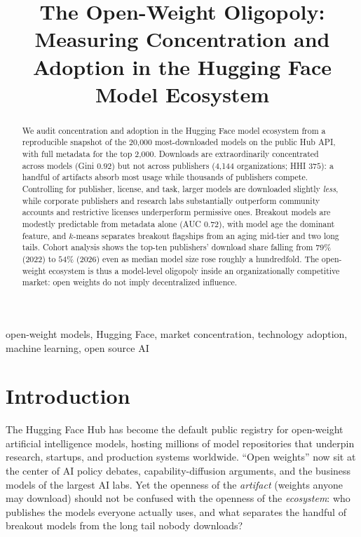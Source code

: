 \documentclass[conference]{IEEEtran}
\begin{document}
\title{\fontsize{24}{28}\selectfont The Open-Weight Oligopoly: Measuring
Concentration and Adoption in the Hugging Face Model Ecosystem}

\author{
}
\maketitle
\thispagestyle{empty}

\begin{abstract}
We audit concentration and adoption in the Hugging Face model ecosystem from a reproducible snapshot of the 20,000 most-downloaded models on the public Hub API, with full metadata for the top 2,000. Downloads are extraordinarily concentrated across models (Gini $0.92$) but not across publishers (4,144 organizations; HHI $375$): a handful of artifacts absorb most usage while thousands of publishers compete. Controlling for publisher, license, and task, larger models are downloaded slightly \emph{less}, while corporate publishers and research labs substantially outperform community accounts and restrictive licenses underperform permissive ones. Breakout models are modestly predictable from metadata alone (AUC $0.72$), with model age the dominant feature, and $k$-means separates breakout flagships from an aging mid-tier and two long tails. Cohort analysis shows the top-ten publishers' download share falling from $79\%$ (2022) to $54\%$ (2026) even as median model size rose roughly a hundredfold. The open-weight ecosystem is thus a model-level oligopoly inside an organizationally competitive market: open weights do not imply decentralized influence.
\end{abstract}

\begin{IEEEkeywords}
open-weight models, Hugging Face, market concentration, technology adoption,
machine learning, open source AI
\end{IEEEkeywords}

\section{Introduction}
The Hugging Face Hub has become the default public registry for open-weight
artificial intelligence models, hosting millions of model repositories that
underpin research, startups, and production systems worldwide. ``Open
weights'' now sit at the center of AI policy debates, capability-diffusion
arguments, and the business models of the largest AI labs. Yet the openness
of the \emph{artifact} (weights anyone may download) should not be confused
with the openness of the \emph{ecosystem}: who publishes the models everyone
actually uses, and what separates the handful of breakout models from the
long tail nobody downloads?
\end{document}
